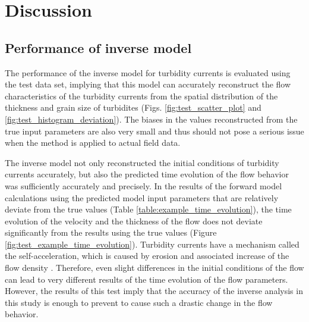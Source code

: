 \section{Discussion}

\subsection{Performance of inverse model}
The performance of the inverse model for turbidity currents is evaluated using the test data set, implying that this model can accurately reconstruct the flow characteristics of the turbidity currents from the spatial distribution of the thickness and grain size of turbidites (Figs. \ref{fig:test_scatter_plot} and \ref{fig:test_histogram_deviation}). The biases in the values reconstructed from the true input parameters are also very small and thus should not pose a serious issue when the method is applied to actual field data.  

The inverse model not only reconstructed the initial conditions of turbidity currents accurately, but also the predicted time evolution of the flow behavior was sufficiently accurately and precisely. In the results of the forward model calculations using the predicted model input parameters that are relatively deviate from the true values (Table \ref{table:example_time_evolution}), the time evolution of the velocity and the thickness of the flow does not deviate significantly from the results using the true values (Figure \ref{fig:test_example_time_evolution}). Turbidity currents have a mechanism called the self-acceleration, which is caused by erosion and associated increase of the flow density \citep{parker1986self,Naruse2007,Sequeiros2009}. Therefore, even slight differences in the initial conditions of the flow can lead to very different results of the time evolution of the flow parameters. However, the results of this test imply that the accuracy of the inverse analysis in this study is enough to prevent to cause such a  drastic change in the flow behavior.

